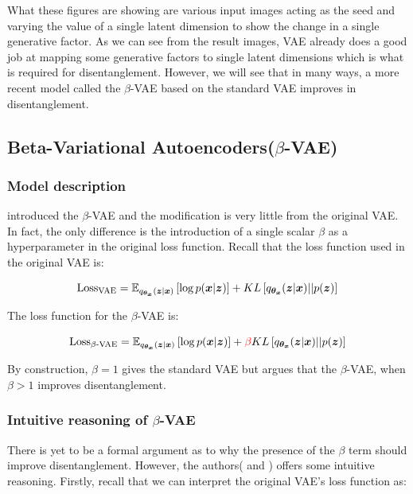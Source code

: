                 What these figures are showing are various input images acting as the seed and varying the value of a single latent dimension to show the change in a single generative factor. As we can see from the result images, VAE already does a good job at mapping some generative factors to single latent dimensions which is what is required for disentanglement. However, we will see that in many ways, a more recent model called the $\beta$-VAE based on the standard VAE improves in disentanglement.
                
        \subsection{Beta-Variational Autoencoders($\beta$-VAE)}
            \subsubsection{Model description}
                \cite{higgins2016beta} introduced the $\beta$-VAE and the modification is very little from the original VAE. In fact, the only difference is the introduction of a single scalar $\beta$ as a hyperparameter in the original loss function. Recall that the loss function used in the original VAE is:
                
                \[ \text{Loss\textsubscript{VAE}} = \mathbb{E}_{q_{\bm{\theta_x}}(\bm{z}|\bm{x})} \left[\log p(\bm{x} | \bm{z}) \right] + KL\left[q_{\bm{\theta_x}}(\bm{z}|\bm{x}) || p(\bm{z})\right] \]
                
                The loss function for the $\beta$-VAE is:
                
                \[ \text{Loss\textsubscript{$\beta$-VAE}} = \mathbb{E}_{q_{\bm{\theta_x}}(\bm{z}|\bm{x})} \left[\log p(\bm{x} | \bm{z}) \right] + \textcolor{red}{\beta} KL\left[q_{\bm{\theta_x}}(\bm{z}|\bm{x}) || p(\bm{z})\right] \]
                
                By construction, $\beta=1$ gives the standard VAE but \cite{higgins2016beta} argues that the $\beta$-VAE, when $\beta>1$ improves disentanglement.
                
            \subsubsection{Intuitive reasoning of $\beta$-VAE}
                There is yet to be a formal argument as to why the presence of the $\beta$ term should improve disentanglement. However, the authors(\cite{higgins2016beta} and \cite{burgess2018understanding}) offers some intuitive reasoning. Firstly, recall that we can interpret the original VAE's loss function as:
                
